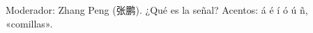 \documentclass[a4paper]{article}
\begin{document}
Moderador: Zhang Peng (张鹏). ¿Qué es la señal? Acentos: á é í ó ú ñ, «comillas».
\end{document}
